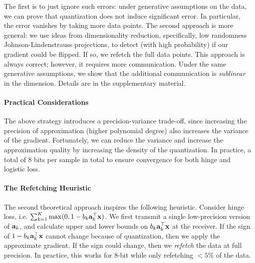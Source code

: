 \documentclass{article}
\def\a{{\bf a}}
\def\x{{\bf x}}
\begin{document}
The first is to just ignore such errors: under generative assumptions on the data, we can prove that quantization does not induce significant error. 
In particular, the error vanishes by taking more data points.
The second approach is more general: we use ideas from dimensionality reduction, specifically, low randomness Johnson-Lindenstrauss projections, to detect (with high probability) if our gradient could be flipped. If so, we refetch the full data points. 
This approach is always correct; however, it requires more communication.
Under the same generative assumptions, we show that the additional communication is \emph{sublinear} in the dimension.
Details are in the supplementary material.

\vspace{-0.5em}
\paragraph{Practical Considerations} The above strategy introduces a precision-variance trade-off, since increasing the precision of approximation (higher polynomial degree) also increases the variance of the gradient. 
Fortunately, we can reduce the variance and increase the approximation quality by increasing the density of the quantization. 
In practice, a total of $8$ bits per sample in total to ensure convergence for both hinge and logistic loss. 

\vspace{-0.5em}
\paragraph*{The Refetching Heuristic}
The second theoretical approach inspires the following heuristic. 
Consider hinge loss, i.e.  $\sum_{k=1}^K \max(0, 1 - b_k \a_k^\top \x)$. 
We first transmit a single low-precision version of $\a_k$, and   
calculate upper and lower bounds on $b_k \a_k^\top \x$ at the receiver.
If the sign of $1-b_k \a_k^\top \x$ cannot change because of quantization, then we apply the approximate gradient. 
If the sign could change, then we {\em refetch} the data at full precision.
In practice, this works for 
8-bit while only refetching $<5\%$ of the data.
\end{document}
